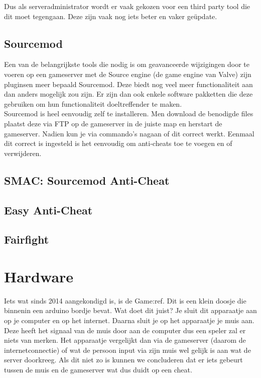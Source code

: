 \documentclass[pdftex,a4paper,12pt,twoside]{report}
\begin{document}
Dus als serveradministrator wordt er vaak gekozen voor een third party tool die dit moet tegengaan. Deze zijn vaak nog iets beter en vaker geüpdate. 


\subsection{Sourcemod}
\label{sec:sourcemod}
Een van de belangrijkste tools die nodig is om geavanceerde wijzigingen door te voeren op een gameserver met de Source engine (de game engine van Valve) zijn pluginsen meer bepaald Sourcemod. Deze biedt nog veel meer functionaliteit aan dan anders mogelijk zou zijn. Er zijn dan ook enkele software pakketten die deze gebruiken om hun functionaliteit doeltreffender te maken. 
\\

Sourcemod is heel eenvoudig zelf te installeren. Men download de benodigde files plaatst deze via FTP op de gameserver in de juiste map en herstart de gameserver. Nadien kun je via commando's nagaan of dit correct werkt. Eenmaal dit correct is ingesteld is het eenvoudig om anti-cheats toe te voegen en of verwijderen. 

\subsection{SMAC: Sourcemod Anti-Cheat}
\label{sec:smac}


\subsection{Easy Anti-Cheat}
\label{sec:easy}

\subsection{Fairfight}
\label{sec:fairfight}


\section{Hardware}
\label{sec:antihardware}
Iets wat sinds 2014 aangekondigd is, is de Game:ref. Dit is een klein doosje die binnenin een arduino bordje bevat. Wat doet dit juist? Je sluit dit apparaatje aan op je computer en op het internet. Daarna sluit je op het apparaatje je muis aan. Deze heeft het signaal van de muis door aan de computer dus een speler zal er niets van merken. 
Het apparaatje vergelijkt dan via de gameserver (daarom de internetconnectie) of wat de persoon input via zijn muis wel gelijk is aan wat de server doorkreeg. Als dit niet zo is kunnen we concluderen dat er iets gebeurt tussen de muis en de gameserver wat dus duidt op een cheat. 
\\
\end{document}
